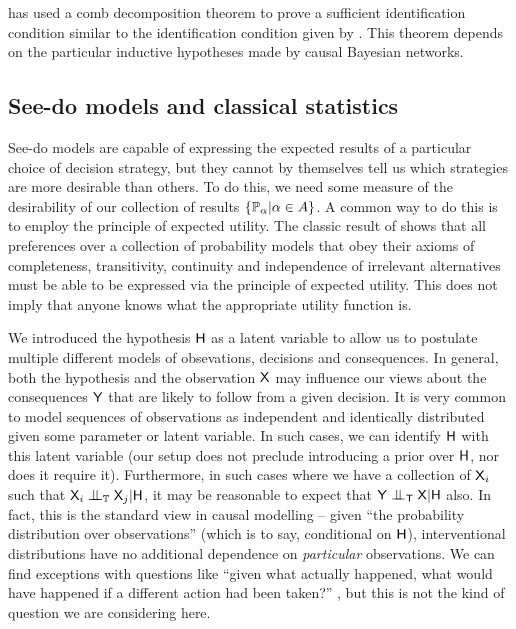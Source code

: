 \citet{jacobs_causal_2019} has used a comb decomposition theorem to prove a sufficient identification condition similar to the identification condition given by \citet{tian2002general}. This theorem depends on the particular inductive hypotheses made by causal Bayesian networks.

\subsection{See-do models and classical statistics}

See-do models are capable of expressing the expected results of a particular choice of decision strategy, but they cannot by themselves tell us which strategies are more desirable than others. To do this, we need some measure of the desirability of our collection of results $\{\mathbb{P}_\alpha|\alpha\in A\}$. A common way to do this is to employ the principle of expected utility. The classic result of \citet{von_neumann_theory_1944} shows that all preferences over a collection of probability models that obey their axioms of completeness, transitivity, continuity and independence of irrelevant alternatives must be able to be expressed via the principle of expected utility. This does not imply that anyone knows what the appropriate utility function is.

We introduced the hypothesis $\mathsf{H}$ as a latent variable to allow us to postulate multiple different models of obsevations, decisions and consequences. In general, both the hypothesis and the observation $\mathsf{X}$ may influence our views about the consequences $\mathsf{Y}$ that are likely to follow from a given decision. It is very common to model sequences of observations as independent and identically distributed given some parameter or latent variable. In such cases, we can identify $\mathsf{H}$ with this latent variable (our setup does not preclude introducing a prior over $\mathsf{H}$, nor does it require it). Furthermore, in such cases where we have a collection of $\mathsf{X}_i$ such that $\RV{X}_i\CI_{\model{T}} \RV{X}_j|\RV{H}$, it may be reasonable to expect that $\RV{Y} \CI_{\RV{T}} \RV{X}|\RV{H}$ also. In fact, this is the standard view in causal modelling -- given ``the probability distribution over observations'' (which is to say, conditional on $\mathsf{H}$), interventional distributions have no additional dependence on \emph{particular} observations. We can find exceptions with questions like ``given what actually happened, what would have happened if a different action had been taken?'' \citep{pearl_causality:_2009,tian_probabilities_2000,mueller_causes_2021}, but this is not the kind of question we are considering here.

